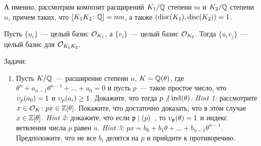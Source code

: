 	\begin{statement} 
		А именно, рассмотрим композит расщирений $K_1/\mathbb{Q}$ степени $m$ и $K_2/\mathbb{Q}$ степени $n$, причем таких, что $[K_1 K_2 \colon \mathbb{Q}] = mn$, а также $(\operatorname{disc}(K_1), \operatorname{disc}(K_2)) = 1$. 

	 Пусть $\{u_i \}$~--- целый базис $\mathcal{O}_{K_1}$, а $\{ v_i \}$~--- целый базис $\mathcal{O}_{K_2}$. Тогда $\{ u_i v_j \}$~--- целый базис для $\mathcal{O}_{K_1 K_2}$.
	\end{statement}

	\begin{homework}\label{hw_7}
		Задачи:
		\begin{enumerate}
			\item Пусть $K/\mathbb{Q}$~--- расширение степени $n$, $K = \mathbb{Q}(\theta)$, где $\theta^n + a_{n - 1}\theta^{n - 1} + \ldots + a_0 = 0$ и пусть $p$~--- такое простое число, что $\upsilon_{p}(a_0) = 1$ и $\upsilon_{p}(a_i) \ge 1$. Докажите, что тогда $p \not \ \mid \operatorname{ind}(\theta)$.
			\emph{Hint 1:} рассмотрите $x \in \mathcal{O}_{K}\colon px \in \mathbb{Z}[\theta]$. Покажите, что достаточно доказать, что в этом случае $x \in \mathbb{Z}[\theta]$. \emph{Hint 2:} докажите, что если $\mathfrak{p} \mid (p)$~, то $\upsilon_{\mathfrak{p}}(\theta) = 1$ и индекс ветвления числа $p$ равен $n$. \emph{Hint 3:} $px = b_0 + b_1 \theta + \ldots + b_{n - 1}\theta^{n - 1}$. Предположите, что не все $b_i$ делятся на $p$ и прийдите к противоречию. 
		\end{enumerate}
	\end{homework}



